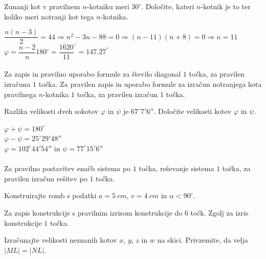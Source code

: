 \documentclass[addpoints]{exam}
\begin{document}
\begin{questions}


    \question[3]
    Zunanji kot v pravilnem $n$-kotniku meri $30^\circ$. Določite, kateri $n$-kotnik je to ter koliko meri notranji kot tega $n$-kotnika.

    \begin{solution}[6cm]
        $ \dfrac{n(n-3)}{2}=44 \Rightarrow n^2-3n-88=0 \Rightarrow (n-11)(n+8)=0 \Rightarrow n=11 $ \\
        $ \varphi=\dfrac{n-2}{n}180^\circ=\dfrac{1620}{11}^\circ=147.\overline{27}^\circ $ \\ \\
        Za zapis in pravilno uporabo formule za število diagonal $1$ točka, za pravilen izračuna $1$ točka. 
        Za pravilen zapis in uporabo formule za izračun notranjega kota pravilnega $n$-kotnika $1$ točka, za pravilen izračun $1$ točka.
    \end{solution}



    \question[5]
    Razlika velikosti dveh sokotov $\varphi$ in $\psi$ je $67^\circ 7' 6''$.
    Določite velikosti kotov $\varphi$ in $\psi$.

    \begin{solution}[5cm]
        $\varphi+\psi=180^\circ$ \\
        $\varphi-\psi=25^\circ 29' 48''$ \\
        $\varphi=102^\circ 44' 54''$ in $\psi=77^\circ 15' 6 ''$ \\ \\
        Za pravilno postavitev enačb sistema po $1$ točka, reševanje sistema $1$ točka, za pravilen izračun rešitev po $1$ točka.
    \end{solution}

    

    \newpage

    \question[6]
    Konstruirajte romb s podatki $a=5~cm$, $v=4~cm$ in $\alpha<90^\circ$.

    \begin{solution}[15cm]
        Za zapis konstrukcije s pravilnim izrisom konstrukcije do $6$ točk. Zgolj za izris konstrukcije $1$ točka.
    \end{solution}




    \newpage

    \question[4]
    Izračunajte velikosti neznanih kotov $x$, $y$, $z$ in $w$ na skici. Privzemite, da velja $|ML|=|NL|$.


\end{questions}
\end{document}
